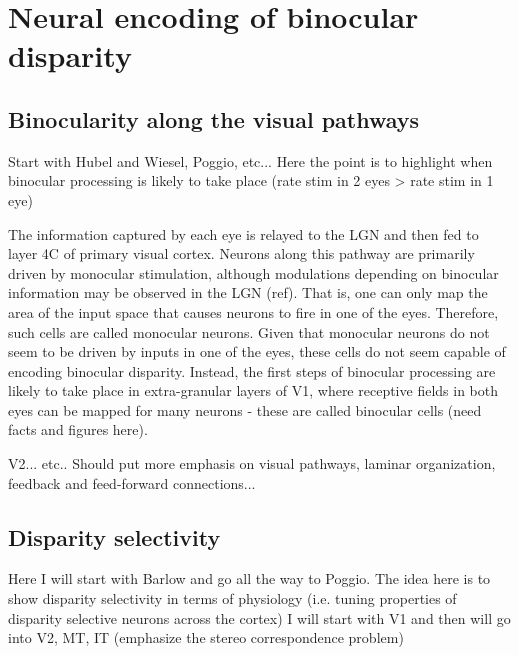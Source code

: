 \documentclass[oneside,12pt]{classes/CUEDthesisPSnPDF}
\begin{document}
\section{Neural encoding of binocular disparity}  %

\subsection{Binocularity along the visual pathways}
Start with Hubel and Wiesel, Poggio, etc... Here the point is to highlight when binocular processing is likely to take place (rate stim in 2 eyes > rate stim in 1 eye) 

The information captured by each eye is relayed to the LGN and then fed to layer 4C of primary visual cortex. Neurons along this pathway are primarily driven by monocular stimulation, although modulations depending on binocular information may be observed in the LGN (ref). That is, one can only map the area of the input space that causes neurons to fire in one of the eyes. Therefore, such cells are called monocular neurons. Given that monocular neurons do not seem to be driven by inputs in one of the eyes, these cells do not seem capable of encoding binocular disparity. Instead, the first steps of binocular processing are likely to take place in extra-granular layers of V1, where receptive fields in both eyes can be mapped for many neurons - these are called binocular cells (need facts and figures here).

V2... etc..
Should put more emphasis on visual pathways, laminar organization, feedback and feed-forward connections...

\subsection{Disparity selectivity}
Here I will start with Barlow and go all the way to Poggio.
The idea here is to show disparity selectivity in terms of physiology (i.e. tuning properties of disparity selective neurons across the cortex)
I will start with V1 and then will go into V2, MT, IT (emphasize the stereo correspondence problem)
\end{document}
